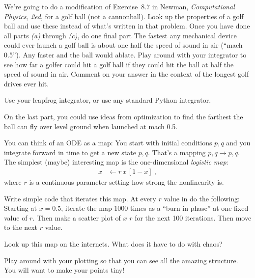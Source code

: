 \documentclass[12pt]{article}
\begin{document}
\begin{problem}
  We're going to do a modification of Exercise~8.7 in Newman, \textit{Computational Physics, 2ed},
  for a golf ball (not a cannonball).
  Look up the properties of a golf ball and use these instead of what's written in that problem.
  Once you have done all parts \textsl{(a)} through \textsl{(c)}, do one final part
  \setcounter{subpart}{3}
  \subpart The fastest any mechanical device could ever launch a golf ball is about one half the speed of sound in air (``mach 0.5'').
  Any faster and the ball would ablate.
  Play around with your integrator to see how far a golfer could hit a golf ball if they could hit the ball at half the speed of sound in air.
  Comment on your answer in the context of the longest golf drives ever hit.
\end{problem}

\begin{note}
  Use your leapfrog integrator, or use any standard Python integrator.
\end{note}

\begin{note}
  On the last part, you could use ideas from optimization to find the
  farthest the ball can fly over level ground when launched at mach
  0.5.
\end{note}

\begin{problem}
  You can think of an ODE as a map:
  You start with initial conditions $p,q$ and you integrate forward in time to get a new state $p,q$.
  That's a mapping $p,q\rightarrow p,q$.
  The simplest (maybe) interesting map is the one-dimensional \emph{logistic map}:
  \begin{align}
    x &\leftarrow r\,x\,[1 - x] ~,
  \end{align}
  where $r$ is a continuous parameter setting how strong the nonlinearity is.

  Write simple code that iterates this map.
  At every $r$ value in  do the following:
  Starting at $x=0.5$, iterate the map 1000 times as a ``burn-in phase'' at one fixed value of $r$.
  Then make a scatter plot of $x$  $r$ for the next 100 iterations.
  Then move to the next $r$ value.

  Look up this map on the internets.
  What does it have to do with chaos?
\end{problem}

\begin{note}
  Play around with your plotting so that you can see all the amazing structure.
  You will want to make your points tiny!
\end{note}
\end{document}
